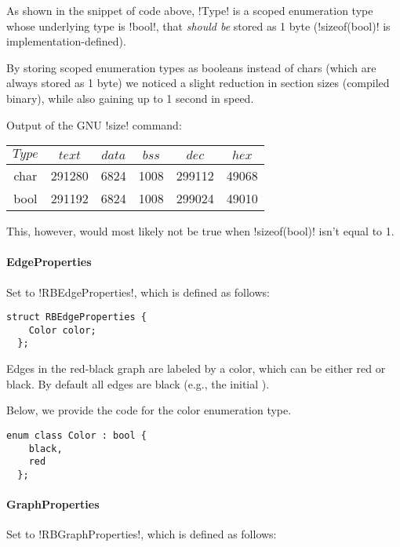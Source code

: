 As shown in the snippet of code above, !Type! is a scoped enumeration type whose underlying type is !bool!, that \emph{should be} stored as 1 byte (!sizeof(bool)! is implementation-defined).

By storing scoped enumeration types as booleans instead of chars (which are always stored as 1 byte) we noticed a slight reduction in section sizes (compiled binary), while also gaining up to 1 second in speed.

Output of the GNU !size! command:

\begin{center}
  \begin{tabular}{c | c c c c c}
    $Type$ & $text$ & $data$ & $bss$ & $dec$  & $hex$ \\
    \hline
    char   & 291280 & 6824   & 1008  & 299112 & 49068 \\
    bool   & 291192 & 6824   & 1008  & 299024 & 49010
  \end{tabular}
\end{center}

This, however, would most likely not be true when !sizeof(bool)! isn't equal to 1.

\paragraph{EdgeProperties}

Set to !RBEdgeProperties!, which is defined as follows:

\begin{lstlisting}[moreemph={Color}]
  struct RBEdgeProperties {
    Color color;
  };
\end{lstlisting}

Edges in the red-black graph are labeled by a color, which can be either red or black.
By default all edges are black (e.g., the initial \grb{}).

Below, we provide the code for the color enumeration type.

\begin{lstlisting}[belowskip=0pt]
  enum class Color : bool {
    black,
    red
  };
\end{lstlisting}

\paragraph{GraphProperties}

Set to !RBGraphProperties!, which is defined as follows:

